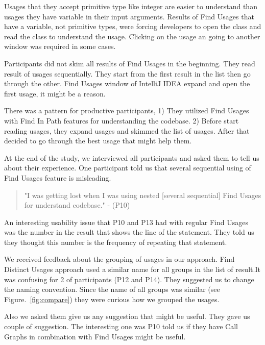 \documentclass[conference]{IEEEtran}
\begin{document}
Usages that they accept primitive type like integer are easier to understand than usages they have variable in their input arguments. Results of Find Usages that have a variable, not primitive types, were forcing developers to open the class and read the class to understand the usage. Clicking on the usage an going to another window was required in some cases.\par

Participants did not skim all results of Find Usages in the beginning. They read result of usages sequentially. They start from the first result in the list then go through the other. Find Usages window of IntelliJ IDEA expand and open the first usage, it might be a reason.\par

There was a pattern for productive participants, 1) They utilized Find Usages with Find In Path features for understanding the codebase.  2) Before start reading usages, they expand usages and skimmed the list of usages. After that decided to go through the best usage that might help them. \par

At the end of the study, we interviewed all participants and asked them to tell us about their experience. One participant told us that several sequential using of Find Usages feature is misleading.
\begin{quote} "I was getting lost when I was using nested [several sequential] Find Usages for understand codebase." - (P10)\end{quote}

 An interesting usability issue that P10 and P13 had with regular Find Usages was the number in the result that shows the line of the statement. They told us they thought this number is the frequency of repeating that statement.\par
 
We received feedback about the grouping of usages in our approach. Find Distinct Usages approach used a similar name for all groups in the list of result.It was confusing for 2 of participants (P12 and P14). They suggested us to change the naming convention. Since the name of all groups was similar (see Figure.~\ref{fig:compare}) they were curious how we grouped the usages.\par

Also we asked them give us any suggestion that might be useful. They gave us couple of suggestion. The interesting one was P10 told us if they have Call Graphs in combination with Find Usages might be useful. 
\end{document}
